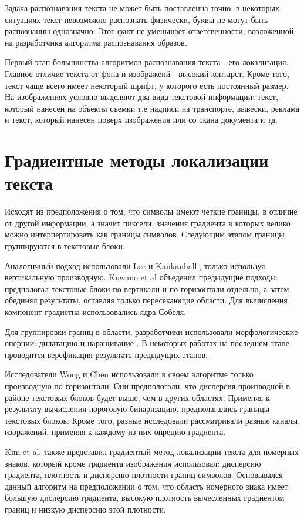 \documentclass[oneside,final,14pt]{extreport}
\begin{document}
Задача распознавания текста не может быть поставленна точно: в некоторых ситуациях текст невозможно распознать физически, буквы не могут быть распознанны однозначно. Этот факт не уменьшает ответсвенности, возложенной на разработчика алгоритма распознавания образов.

Первый   этап большинства алгоритмов распознавания текста - его локализация. Главное отличие текста от фона и изображенй - высокий контарст. Кроме того, текст чаще всего имеет некоторый шрифт, у которого есть постоянный размер. На изображениях  условно выделяют два вида текстовой информации: текст, который нанесен на объекты съемки т.е надписи на транспорте, вывески, реклама и текст, который нанесен поверх изображения или со скана документа и тд. 

\section{Градиентные методы локализации текста}

Исходят из предположения о том, что символы имеют четкие границы, в отличие от другой информации, а значит пиксели, значения градиента в которых велико можно интерпертировать как границы символов. Следующим этапом границы группируются в текстовые блоки.

Аналогичный подход использовали \cite{Lee:text_loc} Lee и Kankanhalli, только используя вертикальную производную. Kuwano et al \cite{Kuwano:text_loc} объеденил предыдущие подходы: предпологал текстовые блоки по вертикали и по горизонтали отдельно, а затем обединял результаты, оставляя только пересекающие области. Для вычисления компонент градиетна использовались ядра Собеля. 

	Для группировки границ в области, разработчики использовали морфологические оперции: дилатацию и наращивание \cite{Dup:cousache}. В некоторых работах на последнем этапе проводится верефикация результата предыдущих этапов.

Исследователи Wong и Chen \cite{Wong:text_loc}\cite{Zunino:text_loc} использовали в своем алгоритме только производную по горизонтали. Они предпологали, что дисперсия производной в районе текстовых блоков будет выше, чем в других областях.  Применяя к результату вычисления пороговую бинаризацию, предполагались границы текстовых блоков.  Кроме того, разные исследовали рассматривали разные каналы изоражений, применяя к каждому из них опрецию градиента.

Kim et al.\cite{Kim:text_loc} также представил градиентый метод локализации текста для номерных знаков, который кроме градиента изображения использовал: дисперсию градиента, плотность и дисперсию плотности границ символов. Основывался данный алгоритм на предположении о том, что область номерного знака имеет большую дисперсию градиента, высокую плотность вычесленных градиентом границ и низкую дисперсию этой плотности.
\end{document}
